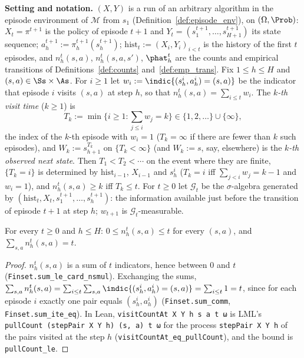 \textbf{Setting and notation.} $(X, Y)$ is a run of an arbitrary algorithm in the episode
environment of $\mathcal M$ from $s_1$ (Definition~\ref{def:episode_env}), on $(\Omega, \Prob)$:
$X_t = \pi^{t+1}$ is the policy of episode $t + 1$ and $Y_t = (s^{t+1}_1, \dots, s^{t+1}_{H+1})$
its state sequence; $a^{t+1}_h := \pi^{t+1}_h(s^{t+1}_h)$; $\mathrm{hist}_t := (X_i, Y_i)_{i < t}$
is the history of the first $t$ episodes, and $n^t_h(s,a)$, $n^t_h(s,a,s')$, $\phat^t_h$ are the
counts and empirical transitions of Definitions~\ref{def:counts} and~\ref{def:emp_trans}. Fix
$1 \le h \le H$ and $(s, a) \in \Ss \times \As$. For $i \ge 1$ let
$w_i := \indic\{(s^i_h, a^i_h) = (s, a)\}$ be the indicator that episode $i$ visits $(s,a)$ at
step $h$, so that $n^t_h(s,a) = \sum_{i \le t} w_i$. The \emph{$k$-th visit time} ($k \ge 1$) is
\[
  T_k := \min\Big\{i \ge 1 : \sum_{j \le i} w_j = k\Big\} \in \{1, 2, \dots\} \cup \{\infty\},
\]
the index of the $k$-th episode with $w_i = 1$ ($T_k = \infty$ if there are fewer than $k$ such
episodes), and $W_k := s^{T_k}_{h+1}$ on $\{T_k < \infty\}$ (and $W_k := s$, say, elsewhere) is
the \emph{$k$-th observed next state}. Then $T_1 < T_2 < \cdots$ on the event where they are
finite, $\{T_k = i\}$ is determined by $\mathrm{hist}_{i-1}$, $X_{i-1}$ and $s^i_h$
($T_k = i$ iff $\sum_{j < i} w_j = k - 1$ and $w_i = 1$), and $n^t_h(s,a) \ge k$ iff $T_k \le t$.
For $t \ge 0$ let $\mathcal G_t$ be the $\sigma$-algebra generated by
$(\mathrm{hist}_t, X_t, s^{t+1}_1, \dots, s^{t+1}_h)$: the information available just before the
transition of episode $t + 1$ at step $h$; $w_{t+1}$ is $\mathcal G_t$-measurable.

\begin{lemma}\label{lem:count_le_episodes}
\leanok
{}
For every $t \ge 0$ and $h \le H$: $0 \le n^t_h(s,a) \le t$ for every $(s,a)$, and
$\sum_{s,a} n^t_h(s,a) = t$.
\end{lemma}

\begin{proof}
\leanok
$n^t_h(s,a)$ is a sum of $t$ indicators, hence between $0$ and $t$
(\texttt{Finset.sum\_le\_card\_nsmul}). Exchanging the sums,
$\sum_{s,a} n^t_h(s,a) = \sum_{i \le t}\sum_{s,a}\indic\{(s^i_h, a^i_h) = (s,a)\} = \sum_{i \le t} 1 = t$,
since for each episode $i$ exactly one pair equals $(s^i_h, a^i_h)$ (\texttt{Finset.sum\_comm},
\texttt{Finset.sum\_ite\_eq}). In Lean, \texttt{visitCountAt X Y h s a t ω} is LML's
\texttt{pullCount (stepPair X Y h) (s, a) t ω} for the process \texttt{stepPair X Y h} of the
pairs visited at the step $h$ (\texttt{visitCountAt\_eq\_pullCount}), and the bound is
\texttt{pullCount\_le}.
\end{proof}

